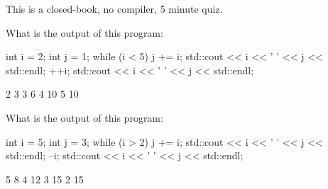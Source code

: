 

This is a closed-book, no compiler, 5 minute quiz.

\nextq
What is the output of this program:
\begin{console}[fontsize=\small]
int i = 2;
int j = 1;
while (i < 5)
{
    j += i;
    std::cout << i << ' ' << j << std::endl;
    ++i;
}
std::cout << i << ' ' << j << std::endl;
\end{console}
\ANSWER
\begin{answercode}
2 3
3 6
4 10
5 10

\end{answercode}

\nextq
What is the output of this program:
\begin{console}[fontsize=\small]
int i = 5;
int j = 3;
while (i > 2)
{
    j += i;
    std::cout << i << ' ' << j << std::endl;
    --i;
}
std::cout << i << ' ' << j << std::endl;
\end{console}
\ANSWER
\begin{answercode}
5 8
4 12
3 15
2 15

\end{answercode}


